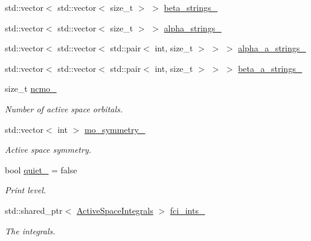 \begin{DoxyCompactItemize}
\item 
std\+::vector$<$ std\+::vector$<$ size\+\_\+t $>$ $>$ \mbox{\hyperlink{classforte_1_1_determinant_substitution_lists_a10bf91f93f5c4fb8dd0280b8b0c11bb6}{beta\+\_\+strings\+\_\+}}
\item 
std\+::vector$<$ std\+::vector$<$ size\+\_\+t $>$ $>$ \mbox{\hyperlink{classforte_1_1_determinant_substitution_lists_a5884d5c1087b3ed9183f351536ea8751}{alpha\+\_\+strings\+\_\+}}
\item 
std\+::vector$<$ std\+::vector$<$ std\+::pair$<$ int, size\+\_\+t $>$ $>$ $>$ \mbox{\hyperlink{classforte_1_1_determinant_substitution_lists_a16a81f525203f43f3475b928efb6400c}{alpha\+\_\+a\+\_\+strings\+\_\+}}
\item 
std\+::vector$<$ std\+::vector$<$ std\+::pair$<$ int, size\+\_\+t $>$ $>$ $>$ \mbox{\hyperlink{classforte_1_1_determinant_substitution_lists_a4bd4848122963012767b87c93354dd53}{beta\+\_\+a\+\_\+strings\+\_\+}}
\item 
size\+\_\+t \mbox{\hyperlink{classforte_1_1_determinant_substitution_lists_a2bb4422644bbcf89fb814ec24318dcb3}{ncmo\+\_\+}}
\begin{DoxyCompactList}\small\item\em Number of active space orbitals. \end{DoxyCompactList}\item 
std\+::vector$<$ int $>$ \mbox{\hyperlink{classforte_1_1_determinant_substitution_lists_a86420e7b470288e43746541e22861569}{mo\+\_\+symmetry\+\_\+}}
\begin{DoxyCompactList}\small\item\em Active space symmetry. \end{DoxyCompactList}\item 
bool \mbox{\hyperlink{classforte_1_1_determinant_substitution_lists_a9ad6af913034ae35c7c97d809076cc45}{quiet\+\_\+}} = false
\begin{DoxyCompactList}\small\item\em Print level. \end{DoxyCompactList}\item 
std\+::shared\+\_\+ptr$<$ \mbox{\hyperlink{classforte_1_1_active_space_integrals}{Active\+Space\+Integrals}} $>$ \mbox{\hyperlink{classforte_1_1_determinant_substitution_lists_ad02e691009f7764288979b75c8d7cc21}{fci\+\_\+ints\+\_\+}}
\begin{DoxyCompactList}\small\item\em The integrals. \end{DoxyCompactList}\end{DoxyCompactItemize}


